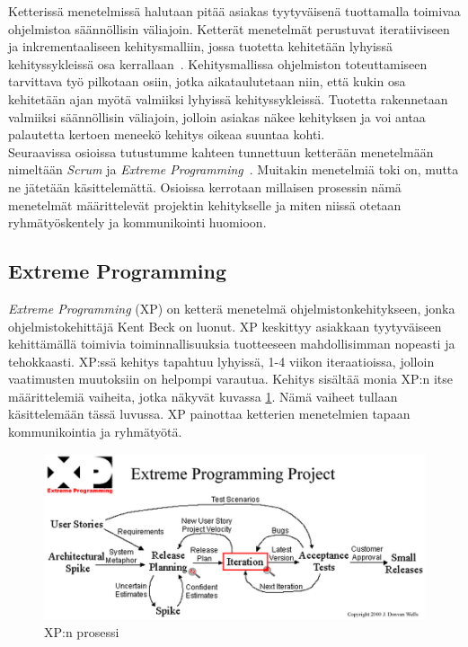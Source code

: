 \documentclass[finnish]{../tktltiki2}
\theoremstyle{definition}
\theoremstyle{remark}
\begin{document}
Ketterissä menetelmissä halutaan pitää asiakas tyytyväisenä tuottamalla toimivaa
ohjelmistoa säännöllisin väliajoin. Ketterät menetelmät perustuvat iteratiiviseen ja inkrementaaliseen kehitysmalliin, jossa tuotetta kehitetään lyhyissä kehityssykleissä osa kerrallaan~\cite{Cockburn:2008}. Kehitysmallissa ohjelmiston toteuttamiseen tarvittava työ pilkotaan osiin, jotka aikataulutetaan niin, että kukin osa kehitetään ajan myötä valmiiksi lyhyissä kehityssykleissä. Tuotetta rakennetaan valmiiksi säännöllisin väliajoin, jolloin asiakas näkee kehityksen ja voi antaa palautetta kertoen meneekö kehitys oikeaa suuntaa kohti.\\

Seuraavissa osioissa tutustumme kahteen tunnettuun
ketterään menetelmään nimeltään \emph{Scrum} ja \emph{Extreme Programming}~\cite{ScrumFinnishGuide,Beck:2004:EPE:1076267,Scrumprimer,ScrumHandBook}. Muitakin menetelmiä toki on, mutta ne jätetään käsittelemättä. Osioissa kerrotaan millaisen prosessin nämä menetelmät
määrittelevät projektin kehitykselle ja miten niissä otetaan ryhmätyöskentely ja kommunikointi huomioon.

\subsection{Extreme Programming}

\emph{Extreme Programming} (XP) on ketterä menetelmä ohjelmistonkehitykseen, jonka
ohjelmistokehittäjä Kent Beck on luonut. XP keskittyy asiakkaan tyytyväiseen kehittämällä toimivia toiminnallisuuksia tuotteeseen mahdollisimman nopeasti ja tehokkaasti.
XP:ssä kehitys tapahtuu lyhyissä, 1-4 viikon iteraatioissa, jolloin vaatimusten 
muutoksiin on helpompi varautua. Kehitys sisältää monia XP:n itse määrittelemiä vaiheita, jotka
näkyvät kuvassa \ref{xprocess}. Nämä vaiheet tullaan käsittelemään tässä luvussa.
XP painottaa ketterien menetelmien tapaan kommunikointia ja ryhmätyötä.

\begin{figure}[ht]
     \includegraphics[width=12cm]{xp.png}
     \caption{XP:n prosessi~\cite{XP.ORGMAP}}\label{xprocess}
\end{figure}
\end{document}
